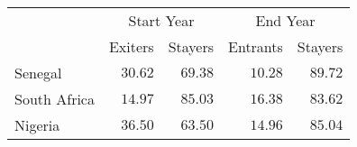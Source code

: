 \begin{longtable}{lrrrr}
\toprule
 & \multicolumn{2}{c}{Start Year} & \multicolumn{2}{c}{End Year} \\ 
\cmidrule(lr){2-3} \cmidrule(lr){4-5}
  & Exiters & Stayers & Entrants & Stayers \\ 
\midrule
Senegal & $30.62$ & $69.38$ & $10.28$ & $89.72$ \\ 
South Africa & $14.97$ & $85.03$ & $16.38$ & $83.62$ \\ 
Nigeria & $36.50$ & $63.50$ & $14.96$ & $85.04$ \\ 
\bottomrule
\end{longtable}

